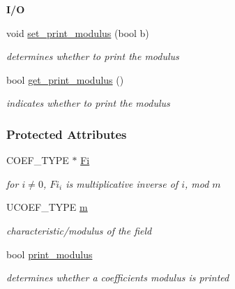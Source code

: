 \begin{Indent}\textbf{ I/O}\par
\begin{DoxyCompactItemize}
\item 
\mbox{\label{group___fields_group_a1ff3ec98ffb33a35c51eb3ce99ae7ebd}} 
void \hyperlink{group___fields_group_a1ff3ec98ffb33a35c51eb3ce99ae7ebd}{set\+\_\+print\+\_\+modulus} (bool b)
\begin{DoxyCompactList}\small\item\em determines whether to print the modulus \end{DoxyCompactList}\item 
\mbox{\label{group___fields_group_a4814e8ada9b0f2248eb65af7d6346244}} 
bool \hyperlink{group___fields_group_a4814e8ada9b0f2248eb65af7d6346244}{get\+\_\+print\+\_\+modulus} ()
\begin{DoxyCompactList}\small\item\em indicates whether to print the modulus \end{DoxyCompactList}\end{DoxyCompactItemize}
\end{Indent}
\subsubsection*{Protected Attributes}
\begin{DoxyCompactItemize}
\item 
\mbox{\label{group___fields_group_ac89c28052f4f4a90263c810f85c81d37}} 
C\+O\+E\+F\+\_\+\+T\+Y\+PE $\ast$ \hyperlink{group___fields_group_ac89c28052f4f4a90263c810f85c81d37}{Fi}
\begin{DoxyCompactList}\small\item\em for $i\neq0$, $Fi_i$ is multiplicative inverse of $i$, mod $m$ \end{DoxyCompactList}\item 
\mbox{\label{group___fields_group_a0fa882a2952f67bf7e071b6f491d6075}} 
U\+C\+O\+E\+F\+\_\+\+T\+Y\+PE \hyperlink{group___fields_group_a0fa882a2952f67bf7e071b6f491d6075}{m}
\begin{DoxyCompactList}\small\item\em characteristic/modulus of the field \end{DoxyCompactList}\item 
\mbox{\label{group___fields_group_ab9ea57c2214d84d29908b445423bb57b}} 
bool \hyperlink{group___fields_group_ab9ea57c2214d84d29908b445423bb57b}{print\+\_\+modulus}
\begin{DoxyCompactList}\small\item\em determines whether a coefficient\textquotesingle{}s modulus is printed \end{DoxyCompactList}\end{DoxyCompactItemize}


